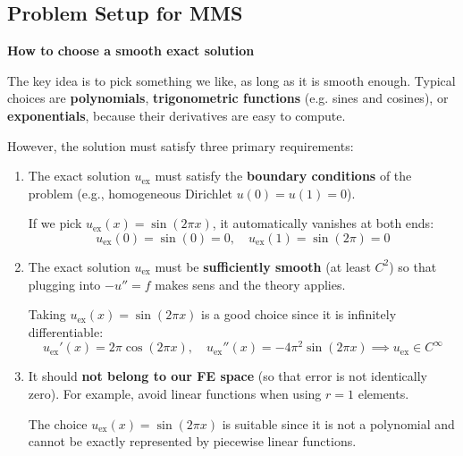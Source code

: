 \subsection{Problem Setup for MMS}

\begin{flushleft}
    \textcolor{Green3}{ \textbf{How to choose a smooth exact solution}}
\end{flushleft}
The key idea is to pick something we like, as long as it is smooth enough. Typical choices are \textbf{polynomials}, \textbf{trigonometric functions} (e.g. sines and cosines), or \textbf{exponentials}, because their derivatives are easy to compute.

\highspace
However, the solution must satisfy three primary requirements:
\begin{enumerate}
    \item The exact solution $u_\text{ex}$ must satisfy the \textbf{boundary conditions} of the problem (e.g., homogeneous Dirichlet $u(0) = u(1) = 0$).
    \begin{examplebox}
        If we pick $u_\text{ex}(x) = \sin(2 \pi x)$, it automatically vanishes at both ends:
        \begin{equation*}
            u_\text{ex}(0) = \sin(0) = 0, \quad u_\text{ex}(1) = \sin(2 \pi) = 0
        \end{equation*}
    \end{examplebox}
    \setcounter{example}{\theexample-1}
    

    \item The exact solution $u_\text{ex}$ must be \textbf{sufficiently smooth} (at least $C^2$) so that plugging into $-u'' = f$ makes sens and the theory applies.
    \begin{examplebox}
        Taking $u_\text{ex}(x) = \sin(2 \pi x)$ is a good choice since it is infinitely differentiable:
        \begin{equation*}
            u_\text{ex}'(x) = 2 \pi \cos(2 \pi x), \quad u_\text{ex}''(x) = -4 \pi^2 \sin(2 \pi x) \implies u_\text{ex} \in C^\infty
        \end{equation*}
    \end{examplebox}
    \setcounter{example}{\theexample-1}


    \item It should \textbf{not belong to our FE space} (so that error is not identically zero). For example, avoid linear functions when using $r = 1$ elements.
    \begin{examplebox}
        The choice $u_\text{ex}(x) = \sin(2 \pi x)$ is suitable since it is not a polynomial and cannot be exactly represented by piecewise linear functions.
    \end{examplebox}
\end{enumerate}

